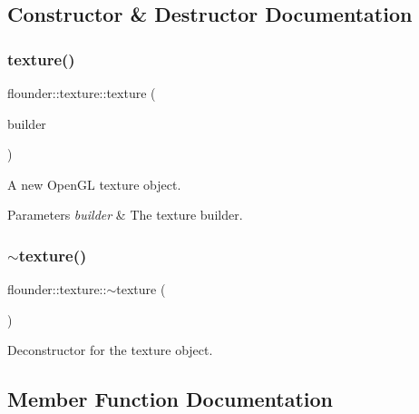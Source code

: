 \subsection{Constructor \& Destructor Documentation}
\mbox{\label{classflounder_1_1texture_a82dd2e895abe671411ab0fcaaf49b5d1}} 
\subsubsection{\texorpdfstring{texture()}{texture()}}
{\footnotesize\ttfamily flounder\+::texture\+::texture (\begin{DoxyParamCaption}\item[{\hyperlink{classflounder_1_1texture_1_1builder}{builder} $\ast$}]{builder }\end{DoxyParamCaption})\hspace{0.3cm}{\ttfamily [protected]}}



A new Open\+GL texture object. 


\begin{DoxyParams}{Parameters}
{\em builder} & The texture builder. \\
\hline
\end{DoxyParams}
\mbox{\label{classflounder_1_1texture_a8271c7f9860a5a235be9b1207bed2c39}} 
\subsubsection{\texorpdfstring{$\sim$texture()}{~texture()}}
{\footnotesize\ttfamily flounder\+::texture\+::$\sim$texture (\begin{DoxyParamCaption}{ }\end{DoxyParamCaption})}



Deconstructor for the texture object. 



\subsection{Member Function Documentation}
\mbox{\label{classflounder_1_1texture_a7405133ba0da2f3a48d32a63535594fa}} 

